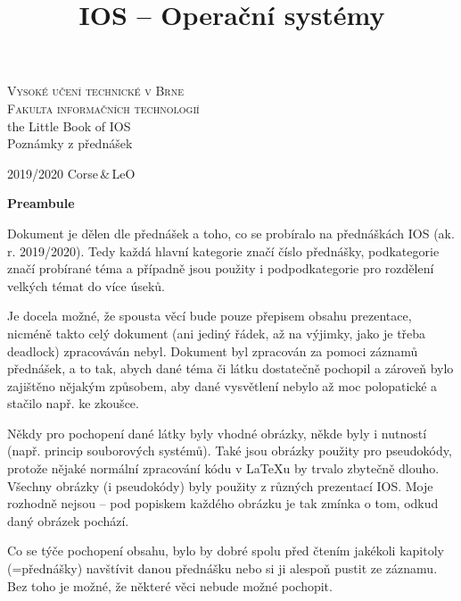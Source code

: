 \documentclass[a4paper, 11pt]{article}
\title{IOS -- Operační systémy}
\date{}
\begin{document}
\begin{titlepage}

\begin{center}
\LARGE
\textsc{\Huge Vysoké učení technické v Brne}\\
\textsc{\huge Fakulta informačních technologií}\\
the Little Book of IOS\\[0.4em]
{\Huge Poznámky z přednášek}
\end{center}
{\Large 2019/2020 \hfill Corse\scriptsize\,\&\,LeO}

\end{titlepage}


\tableofcontents


\newpage

\textbf{Preambule}

Dokument je dělen dle přednášek a toho, co se probíralo na přednáškách IOS (ak. r. 2019/2020). Tedy každá hlavní kategorie značí číslo přednášky, podkategorie značí probírané téma a případně jsou použity i pod\-pod\-ka\-te\-go\-ri\-e pro rozdělení velkých témat do více úseků.

Je docela možné, že spousta věcí bude pouze přepisem obsahu prezentace, nicméně takto celý dokument (ani jediný řádek, až na výjimky, jako je třeba deadlock) zpracováván nebyl. Dokument byl zpracován za pomoci záznamů přednášek, a to tak, abych dané téma či látku dostatečně pochopil a zároveň bylo zajištěno nějakým způsobem, aby dané vysvětlení nebylo až moc polopatické a stačilo např. ke zkoušce.
 
Někdy pro pochopení dané látky byly vhodné obrázky, někde byly i nutností (např. princip souborových systémů). Také jsou obrázky použity pro pseudokódy, protože nějaké normální zpracování kódu v \LaTeX u by trvalo zbytečně dlouho. Všechny obrázky (i pseudokódy) byly použity z různých prezentací IOS. Moje rozhodně nejsou -- pod popiskem každého obrázku je tak zmínka o tom, odkud daný obrázek pochází.
 
Co se týče pochopení obsahu, bylo by dobré spolu před čtením jakékoli kapitoly (=přednášky) navštívit danou přednášku nebo si ji alespoň pustit ze záznamu. Bez toho je možné, že některé věci nebude možné pochopit. 

\newpage
\end{document}
